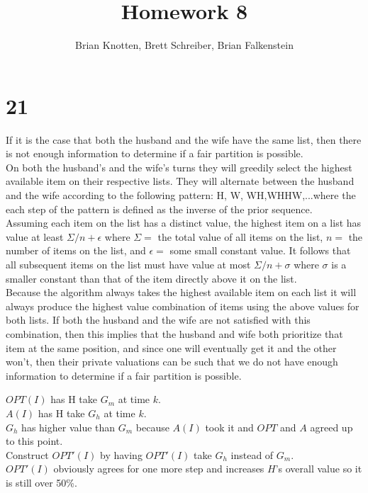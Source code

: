 \documentclass[letterpaper,notitlepage,twoside]{article}
\begin{document}
\title{Homework 8}
\author{Brian Knotten, Brett Schreiber, Brian Falkenstein}
\maketitle

\section*{21}
If it is the case that both the husband and the wife have the same list, then there is not enough information to determine if a fair partition is possible. \\
On both the husband's and the wife's turns they will greedily select the highest available item on their respective lists. They will alternate between the husband and the wife according to the following pattern: H, W, WH,WHHW,...where the each step of the pattern is defined as the inverse of the prior sequence. \\
Assuming each item on the list has a distinct value, the highest item on a list has value at least $\Sigma / n + \epsilon$ where $\Sigma =$ the total value of all items on the list, $n =$ the number of items on the list, and $\epsilon =$ some small constant value. It follows that all subsequent items on the list must have value at most $\Sigma / n + \sigma$ where $\sigma$ is a smaller constant than that of the item directly above it on the list. \\ 
Because the algorithm always takes the highest available item on each list it will always produce the highest value combination of items using the above values for both lists. If both the husband and the wife are not satisfied with this combination, then this implies that the husband and wife both prioritize that item at the same position, and since one will eventually get it and the other won't, then their private valuations can be such that we do not have enough information to determine if a fair partition is possible. 

$OPT(I)$ has H take $G_m$ at time $k$.\\
$A(I)$ has H take $G_h$ at time $k$. \\
$G_h$ has higher value than $G_m$ because $A(I)$ took it and $OPT$ and $A$ agreed up to this point. \\
Construct $OPT'(I)$ by having $OPT'(I)$ take $G_h$ instead of $G_m$. \\
$OPT'(I)$ obviously agrees for one more step and increases $H$'s overall value so it is still over 50\%.
\end{document}

